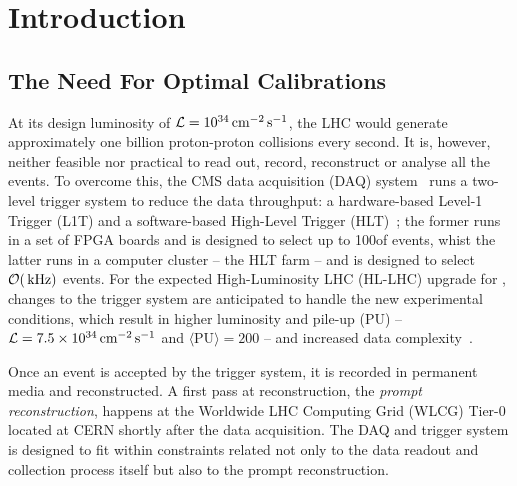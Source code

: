 \chapter{Introduction}

\section{The Need For Optimal Calibrations}
At its design luminosity of $\mathcal{L} = 10^{34}\,\text{cm}^{-2}\,\text{s}^{-1}$, the LHC would generate approximately one billion proton-proton collisions every second. It is, however, neither feasible nor practical to read out, record, reconstruct or analyse all the events. To overcome this, the CMS data acquisition (DAQ) system~\cite{CMS:2008xjf,CMS:2023gfb} runs a two-level trigger system to reduce the data throughput: a hardware-based Level-1 Trigger (L1T) and a software-based High-Level Trigger (HLT)~\cite{CMS:2016ngn}; the former runs in a set of FPGA boards and is designed to select up to 100\kHz of events, whist the latter runs in a computer cluster -- the HLT farm -- and is designed to select $\mathcal{O}(\,\text{kHz})$ events. For the expected High-Luminosity LHC (HL-LHC) upgrade for \Phasetwo, changes to the trigger system are anticipated to handle the new experimental conditions, which result in higher luminosity and pile-up (PU) --
$\mathcal{L} = 7.5\times10^{34}\,\text{cm}^{-2}\,\text{s}^{-1}$
and
$\langle\text{PU}\rangle = 200$ --
and increased data complexity~\cite{Collaboration:2759072, CERN-LHCC-2020-004}.

Once an event is accepted by the trigger system, it is recorded in permanent media and reconstructed. A first pass at reconstruction, the \emph{prompt reconstruction}, happens at the Worldwide LHC Computing Grid (WLCG) Tier-0 located at CERN shortly after the data acquisition. The DAQ and trigger system is designed to fit within constraints related not only to the data readout and collection process itself but also to the prompt reconstruction.


